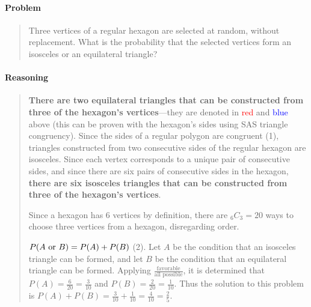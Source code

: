 \documentclass[letterpaper,12pt,twoside]{report}
\begin{document}
	\pagestyle{fancy}
	\fancyhf{}
	
	\paragraph{Problem}
	\begin{quote}
		\textsf{Three vertices of a regular hexagon are selected at random, without replacement. What is the probability that the selected vertices form an isosceles or an equilateral triangle?}
	\end{quote}
	
	\begin{center}
	\end{center}
	
	\paragraph{Reasoning}
	\begin{quotation}
		
		\textbf{There are two equilateral triangles that can be constructed from three of the hexagon's vertices}---they are denoted in \textcolor{red}{red} and \textcolor{blue}{blue} above (this can be proven with the hexagon's sides using SAS triangle congruency). Since the sides of a regular polygon are congruent (1), triangles constructed from two consecutive sides of the regular hexagon are isosceles. Since each vertex corresponds to a unique pair of consecutive sides, and since there are six pairs of consecutive sides in the hexagon, \textbf{there are six isosceles triangles that can be constructed from three of the hexagon's vertices}.
		
		Since a hexagon has 6 vertices by definition, there are ${}_6 C_3=20$ ways to choose three vertices from a hexagon, disregarding order.
		
		$P(A \textrm{\space or } B)=P(A)+P(B)$ (2). Let $A$ be the condition that an isosceles triangle can be formed, and let $B$ be the condition that an equilateral triangle can be formed. Applying $\frac{\text{favorable}}{\text{all possible}}$, it is determined that $P(A)=\frac{6}{20}=\frac{3}{10}$ and $P(B)=\frac{2}{20}=\frac{1}{10}$. Thus the solution to this problem is $P(A)+P(B)=\frac{3}{10}+\frac{1}{10}=\frac{4}{10}=\boxed{\frac{2}{5}}$.
		
	\end{quotation}
	
\end{document}
